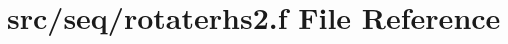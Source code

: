 \hypertarget{seq_2rotaterhs2_8f}{\section{src/seq/rotaterhs2.f File Reference}
\label{seq_2rotaterhs2_8f}
}
